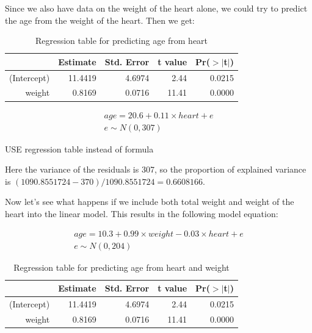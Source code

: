 \documentclass[]{report}\usepackage[]{graphicx}\usepackage[]{color}
\begin{document}
Since we also have data on the weight of the heart alone, we could try to predict the age from the weight of the heart. Then we get:

\begin{table}[ht]
\centering
\caption{Regression table for predicting age from heart} 
\label{tab:multi_2b}
\begin{tabular}{rrrrr}
  \hline
 & Estimate & Std. Error & t value & Pr($>$$|$t$|$) \\ 
  \hline
(Intercept) & 11.4419 & 4.6974 & 2.44 & 0.0215 \\ 
  weight & 0.8169 & 0.0716 & 11.41 & 0.0000 \\ 
   \hline
\end{tabular}
\end{table}


\begin{eqnarray}
age = 20.6 + 0.11 \times  heart + e \\
e \sim N(0, 307)
\end{eqnarray}

USE regression table instead of formula



Here the variance of the residuals is 307, so the proportion of explained variance is $(1090.8551724-370)/1090.8551724  = 0.6608166$.


Now let's see what happens if we include both total weight and weight of the heart into the linear model. This results in the following model equation:


\begin{eqnarray}
age = 10.3 + 0.99 \times  weight  -0.03 \times  heart + e \\
e \sim N(0, 204)
\end{eqnarray}

\begin{table}[ht]
\centering
\caption{Regression table for predicting age from heart and weight} 
\label{tab:multi_2c}
\begin{tabular}{rrrrr}
  \hline
 & Estimate & Std. Error & t value & Pr($>$$|$t$|$) \\ 
  \hline
(Intercept) & 11.4419 & 4.6974 & 2.44 & 0.0215 \\ 
  weight & 0.8169 & 0.0716 & 11.41 & 0.0000 \\ 
   \hline
\end{tabular}
\end{table}
\end{document}
